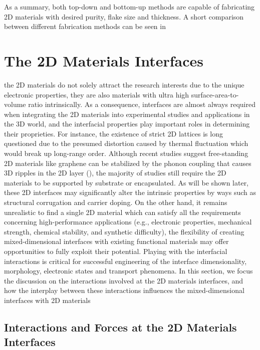 As a summary, both top-down and bottom-up methods are capable of
fabricating 2D materials with desired purity, flake size and
thickness. A short comparison between different fabrication methods can be seen in 



\section{The 2D Materials Interfaces}
\label{sec:2d-mater-interf}
the 2D materials do not solely attract the research interests due to
the unique electronic properties, they are also materials with ultra
high surface-area-to-volume ratio intrinsically. As a consequence,
interfaces are almost always required when integrating the 2D
materials into experimental studies and applications in the 3D world,
and the interfacial properties play important roles in determining
their proprieties. For instance, the existence of strict 2D lattices
is long questioned due to the presumed distortion caused by thermal
fluctuation which would break up long-range order. Although recent
studies suggest free-standing 2D materials like graphene can be
stabilized by the phonon coupling that causes 3D ripples in the 2D
layer (), the majority of studies
still require the 2D materials to be supported by substrate or
encapsulated.  As will be shown later, these 2D interfaces may
significantly alter the intrinsic properties by ways such as
structural corrugation and carrier doping. On the other hand, it
remains unrealistic to find a single 2D material which can satisfy all
the requirements concerning high-performance applications (e.g.,
electronic properties, mechanical strength, chemical stability, and
synthetic difficulty), the flexibility of creating mixed-dimensional
interfaces with existing functional materials may offer opportunities
to fully exploit their potential. Playing with the interfacial
interactions is critical for successful engineering of the interface
dimensionality, morphology, electronic states and transport phenomena.
In this section, we focus the discussion on the interactions involved
at the 2D materials interfaces, and how the interplay between these
interactions influences the mixed-dimensional interfaces with 2D
materials 

\subsection{Interactions and Forces at the 2D Materials Interfaces}
\label{sec:inter-forc-at}

